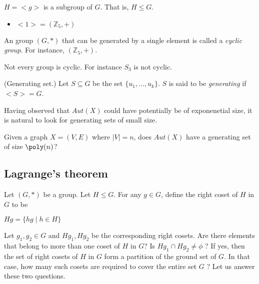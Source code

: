 \begin{observation}$H = <g>$ is a subgroup of $G$. That is, $H\leq G$.
\end{observation}

\begin{example}
\begin{itemize}
\item $<1> = (\mathbb{Z}_5,+)$
\end{itemize}
\end{example}


\begin{definition}An group $(G,*)$ that can be generated by a single element is called a {\em cyclic group}. For instance, $(\mathbb{Z}_5,+)$.
\end{definition}

Not every group is cyclic. For instance $S_3$ is not cyclic.

\begin{definition}(Generating set.)
Let $S\subseteq G$ be the set $\{u_1,\ldots,u_k\}$. $S$ is said to be {\em generating} if $<S>=G$.  
\end{definition}

Having observed that $Aut(X)$ could have potentially be of exponenetial size, it is natural to look for generating sets of small size.

Given a graph $X=(V,E)$ where $|V|=n$, does $Aut(X)$ have a generating set of size $\poly(n)$?

\subsection{Lagrange's theorem}

Let $(G,*)$ be a group. Let $H\leq G$. For any $g\in G$, define the right coset of $H$ in $G$ to be
\begin{center}
$Hg= \{hg \mid h\in H \}$
\end{center}
 

Let $g_1,g_2\in G$ and $Hg_1,Hg_2$ be the corresponding right cosets.  Are there elements that belong to more than one coset of $H$ in $G$? Is $Hg_1\cap Hg_2 \neq \phi$ ? If yes, then the set of right cosets of $H$ in $G$ form a partition of the ground set of $G$. In that case, how many such cosets are required to cover the entire set $G$ ? Let us answer these two questions.

